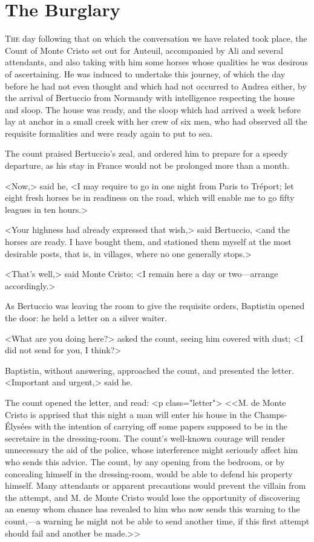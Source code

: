 \chapter{The Burglary} 

 \lettrine{T}{he} day following that on which the conversation we have related took place, the Count of Monte Cristo set out for Auteuil, accompanied by Ali and several attendants, and also taking with him some horses whose qualities he was desirous of ascertaining. He was induced to undertake this journey, of which the day before he had not even thought and which had not occurred to Andrea either, by the arrival of Bertuccio from Normandy with intelligence respecting the house and sloop. The house was ready, and the sloop which had arrived a week before lay at anchor in a small creek with her crew of six men, who had observed all the requisite formalities and were ready again to put to sea. 

 The count praised Bertuccio's zeal, and ordered him to prepare for a speedy departure, as his stay in France would not be prolonged more than a month. 

 <Now,> said he, <I may require to go in one night from Paris to Tréport; let eight fresh horses be in readiness on the road, which will enable me to go fifty leagues in ten hours.> 

 <Your highness had already expressed that wish,> said Bertuccio, <and the horses are ready. I have bought them, and stationed them myself at the most desirable posts, that is, in villages, where no one generally stops.> 

 <That's well,> said Monte Cristo; <I remain here a day or two—arrange accordingly.> 

 As Bertuccio was leaving the room to give the requisite orders, Baptistin opened the door: he held a letter on a silver waiter. 

 <What are you doing here?> asked the count, seeing him covered with dust; <I did not send for you, I think?> 

 Baptistin, without answering, approached the count, and presented the letter. <Important and urgent,> said he. 

 The count opened the letter, and read:  <p class="letter"> <<M. de Monte Cristo is apprised that this night a man will enter his house in the Champs-Élysées with the intention of carrying off some papers supposed to be in the secretaire in the dressing-room. The count's well-known courage will render unnecessary the aid of the police, whose interference might seriously affect him who sends this advice. The count, by any opening from the bedroom, or by concealing himself in the dressing-room, would be able to defend his property himself. Many attendants or apparent precautions would prevent the villain from the attempt, and M. de Monte Cristo would lose the opportunity of discovering an enemy whom chance has revealed to him who now sends this warning to the count,—a warning he might not be able to send another time, if this first attempt should fail and another be made.>> 

